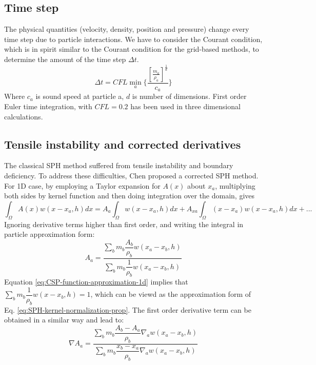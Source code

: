 \documentclass[journal abbreviation, manuscript]{copernicus}
\begin{document}
\subsection{Time step}
The physical quantities (velocity, density, position and pressure) change every time step due to particle interactions. We have to consider the Courant condition, which is in spirit similar to the Courant condition for the grid-based methods, to determine the amount of the time step $\Delta t$.
\begin{equation}
\Delta t = CFL \min_a \bigg \lbrace \dfrac{[\frac{m_a}{\rho_a}]^{\frac{1}{d}}}{c_a} \bigg \rbrace
\end{equation}
Where $c_a$ is sound speed at particle a, $d$ is number of dimensions. First order Euler time integration, with $CFL = 0.2$ has been used in three dimensional calculations.

\subsection{Tensile instability and corrected derivatives}
The classical SPH method suffered from tensile instability and boundary deficiency. To address these difficulties, Chen \citep{chen1999improvement} proposed a corrected SPH method. For 1D case, by employing a Taylor expansion for $A(x)$ about $x_a$, multiplying both sides by kernel function and then doing integration over the domain, gives
\begin{equation}
\int_{\Omega} A(x) w(x- x_a, h) dx = 
A_a \int_{\Omega} w(x - x_a, h) dx +A_{xa} \int_{\Omega} (x-x_a) w(x - x_a, h) dx +...
\end{equation}
Ignoring derivative terms higher than first order, and writing the integral in particle approximation form:
\begin{equation}
A_a = \frac{\sum_b m_b \dfrac{A_b}{\rho_b} w(x_a-x_b, h)}{\sum_b m_b \dfrac{1}{\rho_b} w(x_a-x_b, h)}
\label{eq:CSP-function-approximation-1d}
\end{equation}
Equation \ref{eq:CSP-function-approximation-1d} implies that $\sum_b m_b \dfrac{1}{\rho_b} w(x-x_b, h) = 1$, which can be viewd as the approximation form of Eq. \ref{eq:SPH-kernel-normalization-prop}. The first order derivative term can be obtained in a similar way and lead to:
\begin{equation}
\nabla A_a = \frac{\sum_b m_b \dfrac{A_b - A_a}{\rho_b} \nabla_a w(x_a-x_b, h)}{\sum_b m_b \dfrac{x_b - x_a}{\rho_b} \nabla_a w(x_a-x_b, h)}
\end{equation}
\end{document}
